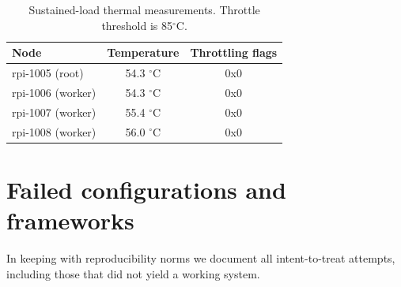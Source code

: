\documentclass[11pt,a4paper]{article}
\begin{document}
\begin{table}[H]
\centering
\caption{Sustained-load thermal measurements. Throttle threshold is 85$^\circ$C.}
\begin{tabular}{lcc}
\toprule
\textbf{Node} & \textbf{Temperature} & \textbf{Throttling flags} \\
\midrule
rpi-1005 (root)   & 54.3 $^\circ$C & 0x0 \\
rpi-1006 (worker) & 54.3 $^\circ$C & 0x0 \\
rpi-1007 (worker) & 55.4 $^\circ$C & 0x0 \\
rpi-1008 (worker) & 56.0 $^\circ$C & 0x0 \\
\bottomrule
\end{tabular}
\end{table}

\section{Failed configurations and frameworks}

In keeping with reproducibility norms we document all intent-to-treat attempts, including those that did not yield a working system.
\end{document}
